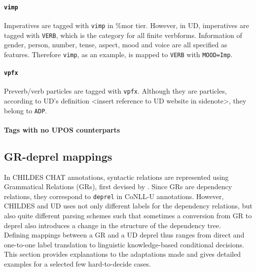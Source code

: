 \paragraph{\texttt{vimp}}
Imperatives are tagged with \texttt{vimp} in \%mor tier. However, in UD, imperatives are tagged with \texttt{VERB}, which is the category for all finite verbforms. Information of gender, person, number, tense, aspect, mood and voice are all specified as features. Therefore \texttt{vimp}, as an example, is mapped to \texttt{VERB} with \texttt{MOOD=Imp}.\\

\paragraph{\texttt{vpfx}}
Preverb/verb particles are tagged with \texttt{vpfx}. Although they are particles, according to UD's definition <insert reference to UD website in sidenote>, they belong to \texttt{ADP}.\\

\paragraph{Tags with no UPOS counterparts}


\subsection{GR-deprel mappings}

In CHILDES CHAT annotations, syntactic relations are represented using Grammatical Relations (GRs), first devised by \cite{Sagae2004}. Since GRs are dependency relations, they correspond to \texttt{deprel} in CoNLL-U annotations. However, CHILDES and UD uses not only different labels for the dependency relations, but also quite different parsing schemes such that sometimes a conversion from GR to deprel also introduces a change in the structure of the dependency tree.\\

Defining mappings between a GR and a UD deprel thus ranges from direct and one-to-one label translation to linguistic knowledge-based conditional decisions. This section provides explanations to the adaptations made and gives detailed examples for a selected few hard-to-decide cases.\\

